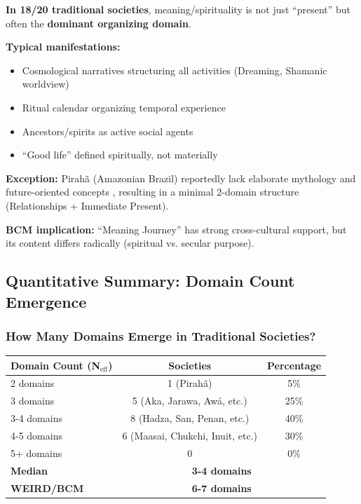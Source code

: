 \begin{tcolorbox}[colback=blue!5!white, colframe=blue!75!black, title=Finding: Meaning/Spirituality = Often Primary Domain]
\textbf{In 18/20 traditional societies}, meaning/spirituality is not just ``present'' but often the \textbf{dominant organizing domain}.

\textbf{Typical manifestations:}
\begin{itemize}[nosep]
\item Cosmological narratives structuring all activities (Dreaming, Shamanic worldview)
\item Ritual calendar organizing temporal experience
\item Ancestors/spirits as active social agents
\item ``Good life'' defined spiritually, not materially
\end{itemize}

\textbf{Exception:} Pirahã (Amazonian Brazil) reportedly lack elaborate mythology and future-oriented concepts \citep{everett2008dont}, resulting in a minimal 2-domain structure (Relationships + Immediate Present).

\textbf{BCM implication:} ``Meaning Journey'' has strong cross-cultural support, but its content differs radically (spiritual vs. secular purpose).
\end{tcolorbox}

\subsection{Quantitative Summary: Domain Count Emergence}

\subsubsection{How Many Domains Emerge in Traditional Societies?}

\begin{center}
\begin{tabular}{@{}lcc@{}}
\toprule
\textbf{Domain Count (N$_{\text{eff}}$)} & \textbf{Societies} & \textbf{Percentage} \\
\midrule
2 domains & 1 (Pirahã) & 5\% \\
3 domains & 5 (Aka, Jarawa, Awá, etc.) & 25\% \\
3-4 domains & 8 (Hadza, San, Penan, etc.) & 40\% \\
4-5 domains & 6 (Maasai, Chukchi, Inuit, etc.) & 30\% \\
5+ domains & 0 & 0\% \\
\midrule
\textbf{Median} & \multicolumn{2}{c}{\textbf{3-4 domains}} \\
\textbf{WEIRD/BCM} & \multicolumn{2}{c}{\textbf{6-7 domains}} \\
\bottomrule
\end{tabular}
\end{center}

